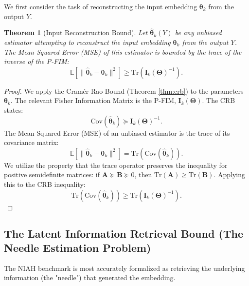 \documentclass{article}
\newtheorem{theorem}{Theorem}[section]
\theoremstyle{definition}
\begin{document}
We first consider the task of reconstructing the input embedding $\boldsymbol{\theta}_k$ from the output $Y$.
\begin{theorem}[Input Reconstruction Bound]
\label{thm:input_reconstruction}
Let $\hat{\boldsymbol{\theta}}_k(Y)$ be any unbiased estimator attempting to reconstruct the input embedding $\boldsymbol{\theta}_k$ from the output $Y$. The Mean Squared Error (MSE) of this estimator is bounded by the trace of the inverse of the P-FIM:
\begin{equation}
    \mathbb{E}[\|\hat{\boldsymbol{\theta}}_k - \boldsymbol{\theta}_k\|^2] \geq \text{Tr}(\mathbf{I}_k(\mathbf{\Theta})^{-1}).
\end{equation}
\end{theorem}
\begin{proof}
We apply the Cramér-Rao Bound (Theorem \ref{thm:crb}) to the parameters $\boldsymbol{\theta}_k$. The relevant Fisher Information Matrix is the P-FIM, $\mathbf{I}_k(\mathbf{\Theta})$. The CRB states:
\begin{equation}
    \text{Cov}(\hat{\boldsymbol{\theta}}_k) \succeq \mathbf{I}_k(\mathbf{\Theta})^{-1}.
\end{equation}
The Mean Squared Error (MSE) of an unbiased estimator is the trace of its covariance matrix:
\begin{equation}
    \mathbb{E}[\|\hat{\boldsymbol{\theta}}_k - \boldsymbol{\theta}_k\|^2] = \text{Tr}(\text{Cov}(\hat{\boldsymbol{\theta}}_k)).
\end{equation}
We utilize the property that the trace operator preserves the inequality for positive semidefinite matrices: if $\mathbf{A} \succeq \mathbf{B} \succeq 0$, then $\text{Tr}(\mathbf{A}) \geq \text{Tr}(\mathbf{B})$. Applying this to the CRB inequality:
\begin{equation}
    \text{Tr}(\text{Cov}(\hat{\boldsymbol{\theta}}_k)) \geq \text{Tr}(\mathbf{I}_k(\mathbf{\Theta})^{-1}).
\end{equation}
\end{proof}

\subsection{The Latent Information Retrieval Bound (The Needle Estimation Problem)}

The NIAH benchmark is most accurately formalized as retrieving the underlying information (the "needle") that generated the embedding.
\end{document}

